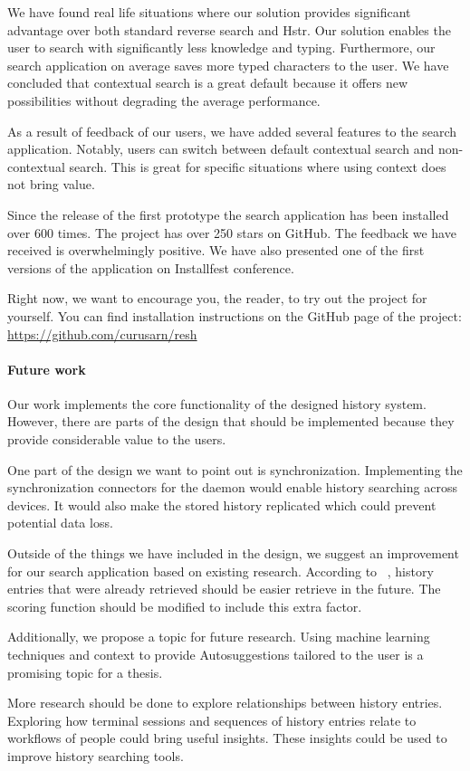 \documentclass[thesis=M,english]{FITthesis}[2012/10/20]
\let\myCite\cite
\renewcommand\cite{\unskip~\myCite}
\begin{document}
\begin{conclusion}
We have found real life situations where our solution provides significant advantage over both standard reverse search and Hstr.
Our solution enables the user to search with significantly less knowledge and typing. Furthermore, our search application on average saves more typed characters to the user. 
We have concluded that contextual search is a great default because it offers new possibilities without degrading the average performance.


As a result of feedback of our users, we have added several features to the search application. Notably, users can switch between default contextual search and non-contextual search. This is great for specific situations where using context does not bring value.

Since the release of the first prototype the search application has been installed over 600 times. The project has over 250 stars on GitHub. The feedback we have received is overwhelmingly positive. We have also presented one of the first versions of the application on Installfest conference. \cite{installfest-talk}\cite{installfest} 

Right now, we want to encourage you, the reader, to try out the project for yourself. You can find installation instructions on the GitHub page of the project: \url{https://github.com/curusarn/resh} %


\paragraph{Future work}

Our work implements the core functionality of the designed history system. However, there are parts of the design that should be implemented because they provide considerable value to the users.

One part of the design we want to point out is synchronization.
Implementing the synchronization connectors for the daemon would enable history searching across devices. It would also make the stored history replicated which could prevent potential data loss.

Outside of the things we have included in the design, we suggest an improvement for our search application based on existing research. According to \cite{greenberg1993computer}, history entries that were already retrieved should be easier retrieve in the future. The scoring function should be modified to include this extra factor. 

Additionally, we propose a topic for future research. Using machine learning techniques and context to provide Autosuggestions tailored to the user is a promising topic for a thesis.   

More research should be done to explore relationships between history entries. Exploring how terminal sessions and sequences of history entries relate to workflows of people could bring useful insights. These insights could be used to improve history searching tools.

\end{conclusion}
\end{document}
